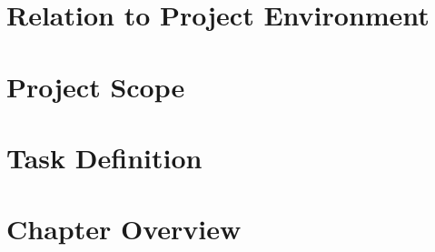 

\section{Relation to Project Environment}
	
	\label{sec:1-relation}
	
\section{Project Scope}
	
	\label{sec:1-scope}
	
\section{Task Definition}
	
	\label{sec:1-task}
	
\section{Chapter Overview}
	
	\label{sec:1-chapters}